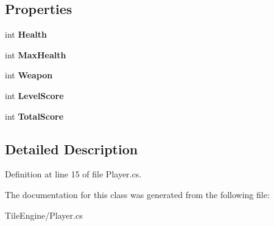 \subsection*{Properties}
\begin{DoxyCompactItemize}
\item 
\hypertarget{class_tile_engine_1_1_player_a5859a9b5810a5078477ca3a2ea47826c}{int {\bfseries Health}}\label{class_tile_engine_1_1_player_a5859a9b5810a5078477ca3a2ea47826c}

\item 
\hypertarget{class_tile_engine_1_1_player_a1be81bcdf3e53278f55a6f643053ebc6}{int {\bfseries Max\-Health}}\label{class_tile_engine_1_1_player_a1be81bcdf3e53278f55a6f643053ebc6}

\item 
\hypertarget{class_tile_engine_1_1_player_a15aa89534fb0c5c4d0632235f9f56a65}{int {\bfseries Weapon}}\label{class_tile_engine_1_1_player_a15aa89534fb0c5c4d0632235f9f56a65}

\item 
\hypertarget{class_tile_engine_1_1_player_ab02f666ed3f5f6bfd3b05a719de41a31}{int {\bfseries Level\-Score}}\label{class_tile_engine_1_1_player_ab02f666ed3f5f6bfd3b05a719de41a31}

\item 
\hypertarget{class_tile_engine_1_1_player_a7382134b6b274ba1bd4992dbbad52a86}{int {\bfseries Total\-Score}}\label{class_tile_engine_1_1_player_a7382134b6b274ba1bd4992dbbad52a86}

\end{DoxyCompactItemize}


\subsection{Detailed Description}


Definition at line 15 of file Player.\-cs.



The documentation for this class was generated from the following file\-:\begin{DoxyCompactItemize}
\item 
Tile\-Engine/Player.\-cs\end{DoxyCompactItemize}
